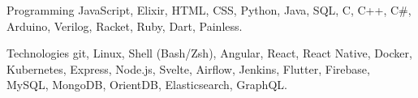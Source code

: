 

\begin{cvskills}

  \cvskill
    {Programming} %
    {JavaScript, Elixir, HTML, CSS, Python, Java, SQL, C, C++, C\#,  Arduino, Verilog, Racket, Ruby, Dart, Painless.} %

  \cvskill
    {Technologies} %
    {git, Linux, Shell (Bash/Zsh), Angular, React, React Native, Docker, Kubernetes, Express, Node.js, Svelte, Airflow, Jenkins, Flutter, Firebase, MySQL, MongoDB, OrientDB, Elasticsearch, GraphQL.} %


\end{cvskills}
